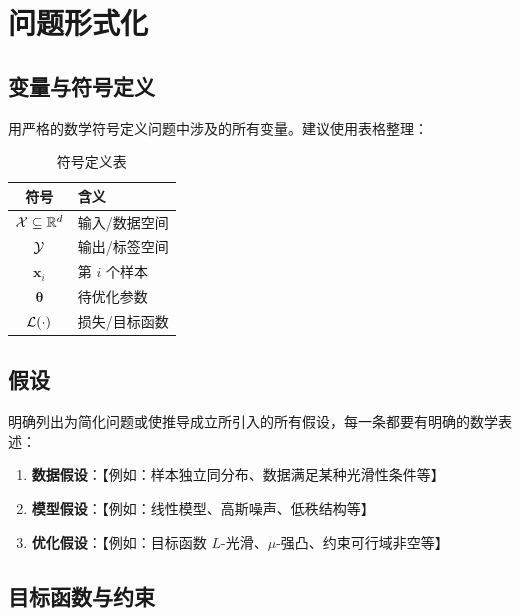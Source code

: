 \section{问题形式化}

\subsection{变量与符号定义}

用严格的数学符号定义问题中涉及的所有变量。建议使用表格整理：

\begin{table}[htbp]
    \centering
    \caption{符号定义表}
    \label{tab:notation}
    \begin{tabular}{c|l}
        \toprule
        符号 & 含义 \\
        \midrule
        $\mathcal{X} \subseteq \mathbb{R}^d$ & 输入/数据空间 \\
        $\mathcal{Y}$                & 输出/标签空间 \\
        $\mathbf{x}_i$      & 第 $i$ 个样本 \\
        $\boldsymbol{\theta}$ & 待优化参数 \\
        $\mathcal{L}(\cdot)$      & 损失/目标函数 \\
        \bottomrule
    \end{tabular}
\end{table}

\subsection{假设}

明确列出为简化问题或使推导成立所引入的所有假设，每一条都要有明确的数学表述：

\begin{enumerate}[label=(\textbf{A\arabic*}), leftmargin=*]
    \item \textbf{数据假设}：【例如：样本独立同分布、数据满足某种光滑性条件等】
    \item \textbf{模型假设}：【例如：线性模型、高斯噪声、低秩结构等】
    \item \textbf{优化假设}：【例如：目标函数 $L$-光滑、$\mu$-强凸、约束可行域非空等】
\end{enumerate}

\subsection{目标函数与约束}

